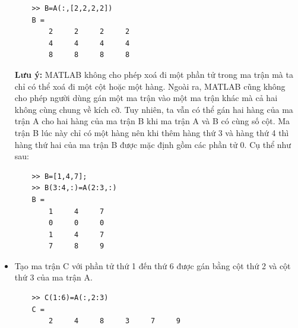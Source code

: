 \documentclass[12pt,a4paper]{article}
\begin{document}
\begin{example}
\begin{itemize}
\begin{lstlisting}
	>> B=A(:,[2,2,2,2])
	B =
     	2     2     2     2
     	4     4     4     4
     	8     8     8     8
\end{lstlisting}
\textbf{Lưu ý:} MATLAB không cho phép xoá đi một phần tử trong ma trận mà ta chỉ có thể xoá đi một cột hoặc một hàng. Ngoài ra, MATLAB cũng không cho phép người dùng gán một ma trận vào một ma trận khác mà cả hai không cùng chung về kích cỡ. Tuy nhiên, ta vẫn có thể gán hai hàng của ma trận A cho hai hàng của ma trận B khi ma trận A và B có cùng số cột. Ma trận B lúc này chỉ có một hàng nên khi thêm hàng thứ 3 và hàng thứ 4 thì hàng thứ hai của ma trận B được mặc định gồm các phần tử 0. Cụ thể như sau:
\begin{lstlisting}
	>> B=[1,4,7];
	>> B(3:4,:)=A(2:3,:)
	B =
     	1     4     7
     	0     0     0
     	1     4     7
     	7     8     9
\end{lstlisting}
	\item Tạo ma trận C với phần tử thứ 1 đến thứ 6 được gán bằng cột thứ 2 và cột thứ 3 của ma trận A.
\begin{lstlisting}
	>> C(1:6)=A(:,2:3)
	C =
     	2     4     8     3     7     9
\end{lstlisting}
\end{itemize}
\end{example}
\end{document}
